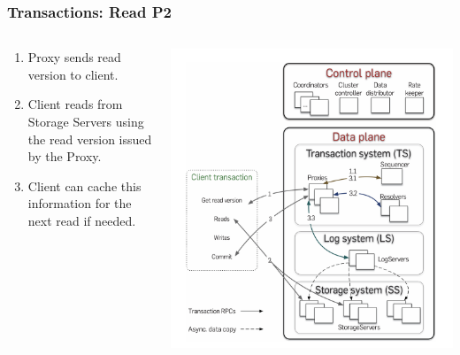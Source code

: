 
\begin{frame}
    \frametitle{Transactions: Read P2}
    \begin{columns}
        \begin{column}{0.5\textwidth}
            \begin{enumerate}
    \item Proxy sends read version to client.
    \item Client reads from Storage Servers using the read version issued by the Proxy.
    \item Client can cache this information for the next read if needed.
            \end{enumerate}
        \end{column}
        \begin{column}{0.5\textwidth}
            \centering
            \includegraphics[width=\textwidth]{img/2-Architecture/Architecture and transaction processing.png}
        \end{column}
    \end{columns}
\end{frame}


